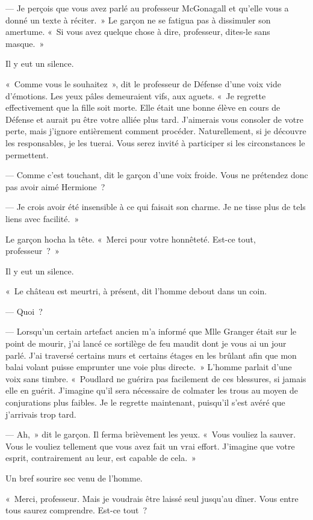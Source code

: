 --- Je perçois que vous avez parlé au professeur McGonagall et qu'elle vous a donné un texte à réciter.~» Le garçon ne se fatigua pas à dissimuler son amertume. «~Si vous avez quelque chose à dire, professeur, dites-le sans masque.~»

Il y eut un silence.

«~Comme vous le souhaitez~», dit le professeur de Défense d'une voix vide d'émotions. Les yeux pâles demeuraient vifs, aux aguets. «~Je regrette effectivement que la fille soit morte. Elle était une bonne élève en cours de Défense et aurait pu être votre alliée plus tard. J'aimerais vous consoler de votre perte, mais j'ignore entièrement comment procéder. Naturellement, si je découvre les responsables, je les tuerai. Vous serez invité à participer si les circonstances le permettent.

--- Comme c'est touchant, dit le garçon d'une voix froide. Vous ne prétendez donc pas avoir aimé Hermione~?

--- Je crois avoir été insensible à ce qui faisait son charme. Je ne tisse plus de tels liens avec facilité.~»

Le garçon hocha la tête. «~Merci pour votre honnêteté. Est-ce tout, professeur~?~»

Il y eut un silence.

«~Le château est meurtri, à présent, dit l'homme debout dans un coin.

--- Quoi~?

--- Lorsqu'un certain artefact ancien m'a informé que Mlle Granger était sur le point de mourir, j'ai lancé ce sortilège de feu maudit dont je vous ai un jour parlé. J'ai traversé certains murs et certains étages en les brûlant afin que mon balai volant puisse emprunter une voie plus directe.~» L'homme parlait d'une voix sans timbre. «~Poudlard ne guérira pas facilement de ces blessures, si jamais elle en guérit. J'imagine qu'il sera nécessaire de colmater les trous au moyen de conjurations plus faibles. Je le regrette maintenant, puisqu'il s'est avéré que j'arrivais trop tard.

--- Ah,~» dit le garçon. Il ferma brièvement les yeux. «~Vous vouliez la sauver. Vous le vouliez tellement que vous avez fait un vrai effort. J'imagine que votre esprit, contrairement au leur, est capable de cela.~»

Un bref sourire sec venu de l'homme.

«~Merci, professeur. Mais je voudrais être laissé seul jusqu'au dîner. Vous entre tous saurez comprendre. Est-ce tout~?


